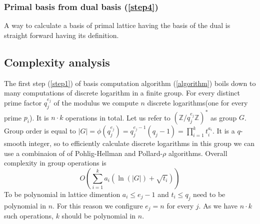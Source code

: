\documentclass[12pt]{article}
\newcommand{\ZZ}{\mathbb{Z}}
\newcommand{\LL}{\mathcal{L}}
\newtheorem{question}{Question}
\begin{document}


\subsubsection{Primal basis from dual basis (\ref{step4})}

A way to calculate a basis of primal lattice having the basis of the dual is straight forward having its definition.


\subsection{Complexity analysis}
The first step (\ref{step1}) of basis computation algorithm (\ref{algorithm}) boils down to many computations of discrete logarithm in a finite group. For every distinct prime factor $q_{j}^{e_{j}}$ of the modulus we compute $n$ discrete logarithms(one for every prime $p_{i}$). It is $n \cdot k$ operations in total. Let us refer to $(\ZZ/q_{j}^{e_{j}}\ZZ)^*$ as group $G$. Group order is equal to $|G| = \phi(q_{j}^{e_{j}}) =  q_{j}^{e_{j}-1}(q_{j}-1) = \prod_{i=1}^{k} t_{i}^{a_{i}}$.
It is a $q$-smooth integer, so to efficiently calculate discrete logarithms in this group we can use a combinaion of of Pohlig-Hellman \cite{[PH78]} and Pollard-$\rho$ \cite{[Pol78]} algorithms. Overall complexity in group operations is
\[
    O(\sum_{i=1}^{k} a_{i}(\ln(|G|) + \sqrt{t_{i}}))
\]
To be polynomial in lattice dimention $a_{i} \leq e_{j}-1$ and $t_{i} \leq q_{j}$ need to be polynomial in $n$. For this reason we configure $e_{j} = n$ for every $j$. As we have $n \cdot k$ such operations, $k$ should be polynomial in $n$.

\end{document}
